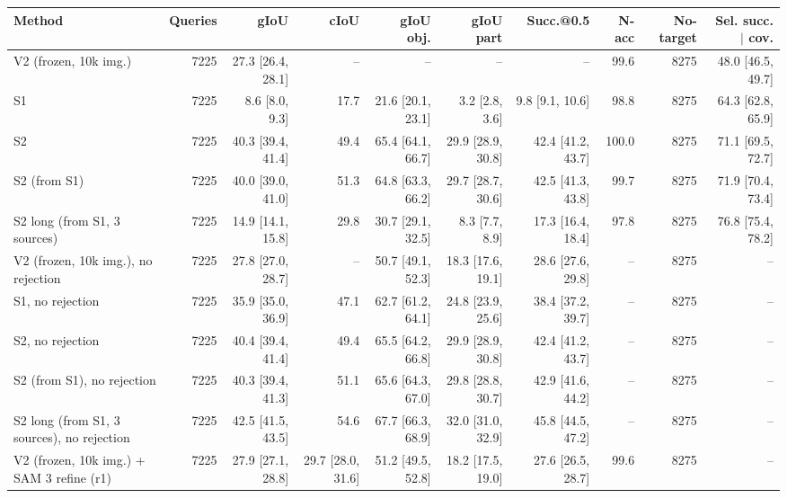 \begin{tabular}{lrrrrrrrrr}
\toprule
Method & Queries & gIoU & cIoU & gIoU obj. & gIoU part & Succ.@0.5 & N-acc & No-target & Sel. succ. $\mid$ cov. \\
\midrule
V2 (frozen, 10k img.) & 7225 & 27.3 \scriptsize{[26.4, 28.1]} & -- & -- & -- & -- & 99.6 & 8275 & 48.0 \scriptsize{[46.5, 49.7]} \\
S1 & 7225 & 8.6 \scriptsize{[8.0, 9.3]} & 17.7 & 21.6 \scriptsize{[20.1, 23.1]} & 3.2 \scriptsize{[2.8, 3.6]} & 9.8 \scriptsize{[9.1, 10.6]} & 98.8 & 8275 & 64.3 \scriptsize{[62.8, 65.9]} \\
S2 & 7225 & 40.3 \scriptsize{[39.4, 41.4]} & 49.4 & 65.4 \scriptsize{[64.1, 66.7]} & 29.9 \scriptsize{[28.9, 30.8]} & 42.4 \scriptsize{[41.2, 43.7]} & 100.0 & 8275 & 71.1 \scriptsize{[69.5, 72.7]} \\
S2 (from S1) & 7225 & 40.0 \scriptsize{[39.0, 41.0]} & 51.3 & 64.8 \scriptsize{[63.3, 66.2]} & 29.7 \scriptsize{[28.7, 30.6]} & 42.5 \scriptsize{[41.3, 43.8]} & 99.7 & 8275 & 71.9 \scriptsize{[70.4, 73.4]} \\
S2 long (from S1, 3 sources) & 7225 & 14.9 \scriptsize{[14.1, 15.8]} & 29.8 & 30.7 \scriptsize{[29.1, 32.5]} & 8.3 \scriptsize{[7.7, 8.9]} & 17.3 \scriptsize{[16.4, 18.4]} & 97.8 & 8275 & 76.8 \scriptsize{[75.4, 78.2]} \\
\midrule
V2 (frozen, 10k img.), no rejection & 7225 & 27.8 \scriptsize{[27.0, 28.7]} & -- & 50.7 \scriptsize{[49.1, 52.3]} & 18.3 \scriptsize{[17.6, 19.1]} & 28.6 \scriptsize{[27.6, 29.8]} & -- & 8275 & -- \\
S1, no rejection & 7225 & 35.9 \scriptsize{[35.0, 36.9]} & 47.1 & 62.7 \scriptsize{[61.2, 64.1]} & 24.8 \scriptsize{[23.9, 25.6]} & 38.4 \scriptsize{[37.2, 39.7]} & -- & 8275 & -- \\
S2, no rejection & 7225 & 40.4 \scriptsize{[39.4, 41.4]} & 49.4 & 65.5 \scriptsize{[64.2, 66.8]} & 29.9 \scriptsize{[28.9, 30.8]} & 42.4 \scriptsize{[41.2, 43.7]} & -- & 8275 & -- \\
S2 (from S1), no rejection & 7225 & 40.3 \scriptsize{[39.4, 41.3]} & 51.1 & 65.6 \scriptsize{[64.3, 67.0]} & 29.8 \scriptsize{[28.8, 30.7]} & 42.9 \scriptsize{[41.6, 44.2]} & -- & 8275 & -- \\
S2 long (from S1, 3 sources), no rejection & 7225 & 42.5 \scriptsize{[41.5, 43.5]} & 54.6 & 67.7 \scriptsize{[66.3, 68.9]} & 32.0 \scriptsize{[31.0, 32.9]} & 45.8 \scriptsize{[44.5, 47.2]} & -- & 8275 & -- \\
\midrule
V2 (frozen, 10k img.) + SAM 3 refine (r1) & 7225 & 27.9 \scriptsize{[27.1, 28.8]} & 29.7 \scriptsize{[28.0, 31.6]} & 51.2 \scriptsize{[49.5, 52.8]} & 18.2 \scriptsize{[17.5, 19.0]} & 27.6 \scriptsize{[26.5, 28.7]} & 99.6 & 8275 & -- \\

\end{tabular}
